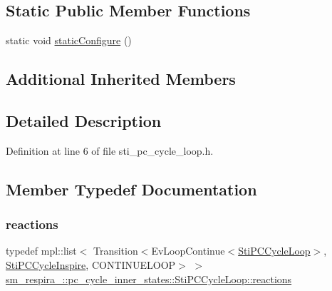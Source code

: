 \subsection*{Static Public Member Functions}
\begin{DoxyCompactItemize}
\item 
static void \hyperlink{structsm__respira__1_1_1pc__cycle__inner__states_1_1StiPCCycleLoop_a1bdc857b4bad937be315add541600224}{static\+Configure} ()
\end{DoxyCompactItemize}
\subsection*{Additional Inherited Members}


\subsection{Detailed Description}


Definition at line 6 of file sti\+\_\+pc\+\_\+cycle\+\_\+loop.\+h.



\subsection{Member Typedef Documentation}
\mbox{\label{structsm__respira__1_1_1pc__cycle__inner__states_1_1StiPCCycleLoop_a0577075a5767b310721c5730b44ad1ad}} 
\subsubsection{\texorpdfstring{reactions}{reactions}}
{\footnotesize\ttfamily typedef mpl\+::list$<$ Transition$<$Ev\+Loop\+Continue$<$\hyperlink{structsm__respira__1_1_1pc__cycle__inner__states_1_1StiPCCycleLoop}{Sti\+P\+C\+Cycle\+Loop}$>$, \hyperlink{structsm__respira__1_1_1pc__cycle__inner__states_1_1StiPCCycleInspire}{Sti\+P\+C\+Cycle\+Inspire}, C\+O\+N\+T\+I\+N\+U\+E\+L\+O\+OP$>$ $>$ \hyperlink{structsm__respira__1_1_1pc__cycle__inner__states_1_1StiPCCycleLoop_a0577075a5767b310721c5730b44ad1ad}{sm\+\_\+respira\+\_\+::pc\+\_\+cycle\+\_\+inner\+\_\+states\+::\+Sti\+P\+C\+Cycle\+Loop\+::reactions}}



